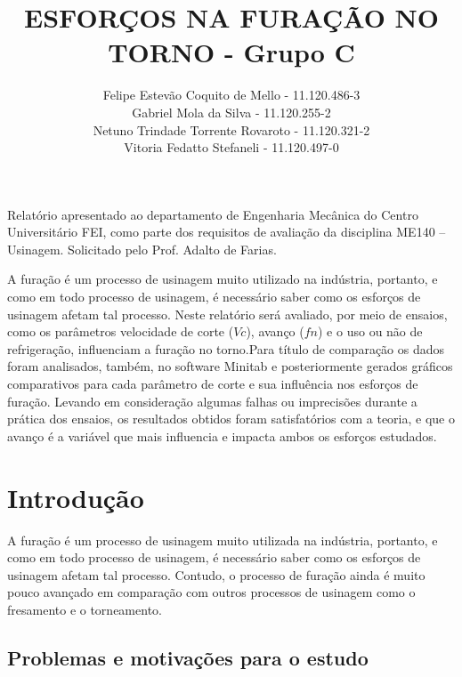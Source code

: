 \documentclass[deposito, acronym, symbols]{fei}
\title{ESFORÇOS NA FURAÇÃO NO TORNO - Grupo C}
\author{ Felipe Estevão Coquito de Mello - 11.120.486-3 \\ Gabriel Mola da Silva - 11.120.255-2 \\ Netuno Trindade Torrente Rovaroto - 11.120.321-2 \\ Vitoria Fedatto Stefaneli - 11.120.497-0}
\begin{document}
\maketitle

\begin{folhaderosto}
Relatório apresentado ao departamento de Engenharia Mecânica do Centro Universitário FEI, como parte dos requisitos de avaliação da disciplina ME140 – Usinagem. Solicitado pelo Prof. Adalto de Farias.
\end{folhaderosto}

\tableofcontents
\listoffigures
\listoftables

\begin{resumo}

A furação é um processo de usinagem muito utilizado na indústria, portanto, e como em todo processo de usinagem, é necessário saber como os esforços de usinagem afetam tal processo. Neste relatório será avaliado, por meio de ensaios, como os parâmetros velocidade de corte ($Vc$), avanço ($fn$) e o uso ou não de refrigeração, influenciam a furação no torno.Para título de comparação os dados foram analisados, também, no software Minitab e posteriormente gerados gráficos comparativos para cada parâmetro de corte e sua influência nos esforços de furação. Levando em consideração algumas falhas ou imprecisões durante a prática dos ensaios, os resultados obtidos foram satisfatórios com a teoria, e que o avanço é a variável que mais influencia e impacta ambos os esforços estudados.


\end{resumo}

\chapter{Introdução}

A furação é um processo de usinagem muito utilizada na indústria, portanto, e como em todo processo de usinagem, é necessário saber como os esforços de usinagem afetam tal processo. Contudo, o processo de furação ainda é muito pouco avançado em comparação com outros processos de usinagem como o fresamento e o torneamento.



\section{Problemas e motivações para o estudo}
\end{document}
